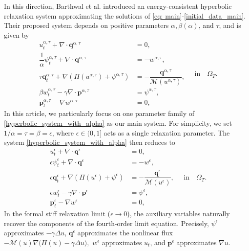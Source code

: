\documentclass[11pt]{article}
\numberwithin{equation}{section}
\newtheorem{counter example}[theorem]{Counter Example}
\numberwithin{equation}{section}
\numberwithin{equation}{section}
\begin{document}
In this direction, Barthwal et al. \cite{barthwal2026energy} introduced an energy-consistent hyperbolic relaxation system approximating the solutions of \eqref{eq: main}-\eqref{initial_data_main}. Their proposed system depends on positive parameters $\alpha, \beta(\alpha)$, and $\tau$, and is given by 
\begin{equation}\label{hyperbolic_system_with_alpha}
\begin{aligned}
     u^{\alpha, \tau}_t+\nabla\cdot \mathbf{q}^{\alpha, \tau}&=0,\\
     \dfrac{1}{\alpha}\psi^{\alpha, \tau}_t+\nabla\cdot \mathbf{q}^{\alpha, \tau}&=-w^{\alpha, \tau},\\
     \tau\mathbf{q}^{\alpha, \tau}_t+\nabla(\Pi(u^{\alpha, \tau})+\psi^{\alpha, \tau})&=-\dfrac{\mathbf{q}^{\alpha, \tau}}{\mathcal{M}(u^{\alpha, \tau})},\\
    \beta w^{\alpha, \tau}_t-\gamma \nabla\cdot \mathbf{p}^{\alpha, \tau}&=\psi^{\alpha, \tau},\\
    \mathbf{p}^{\alpha, \tau}_t-\nabla w^{\alpha, \tau}&=0,
\end{aligned} \quad \mathrm{in}\quad \Omega_T.
\end{equation}
In this article, we particularly focus on one parameter family of \eqref{hyperbolic_system_with_alpha} as our main system. For simplicity, we set $1/\alpha=\tau=\beta=\epsilon$, where $\epsilon\in(0,1]$ acts as a single relaxation parameter. The system \eqref{hyperbolic_system_with_alpha} then reduces to
\begin{equation}\label{hyperbolic_system}
\begin{aligned}
u^{\epsilon}_t+\nabla\cdot \mathbf{q}^{\epsilon}&=0,\\
\epsilon \psi^{\epsilon}_t+\nabla\cdot \mathbf{q}^{\epsilon}&=-w^{\epsilon},\\
\epsilon\mathbf{q}^{\epsilon}_t+\nabla(\Pi(u^{\epsilon})+\psi^{\epsilon})&=-\dfrac{\mathbf{q}^{\epsilon}}{\mathcal{M}(u^{\epsilon})},\\
\epsilon w^{\epsilon}_t-\gamma \nabla\cdot \mathbf{p}^{\epsilon}&=\psi^{\epsilon},\\
\mathbf{p}^{\epsilon}_t-\nabla w^{\epsilon}&=0,
\end{aligned} \quad \mathrm{in}\quad \Omega_T.
\end{equation}
In the formal stiff relaxation limit ($\epsilon\to 0$), the auxiliary variables naturally recover the components of the fourth-order limit equation. Precisely, $\psi^\epsilon$ approximates $-\gamma\Delta u$, $\mathbf q^\epsilon$ approximates the nonlinear flux $-\mathcal M(u)\nabla\bigl(\Pi(u)-\gamma\Delta u\bigr),$  $w^\epsilon$ approximates $u_t$, and $\mathbf p^\epsilon$ approximates $\nabla u$. 
\end{document}

